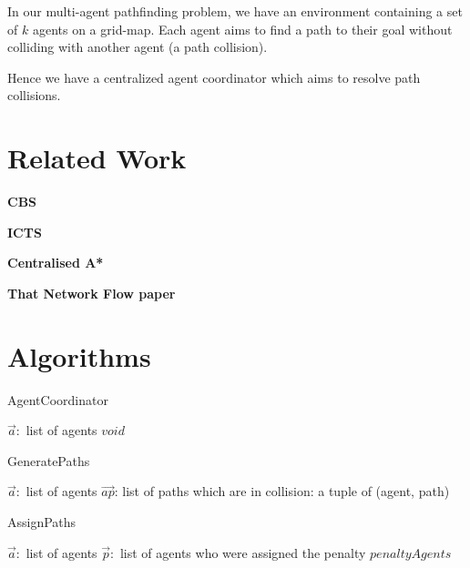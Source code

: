 \documentclass[a4paper,11pt]{article}
\let\oldReturn\Return
\renewcommand{\Return}{\State\oldReturn}
\begin{document}
In our multi-agent pathfinding problem, we have an environment containing a set of $k$ agents on a grid-map. Each agent aims to find a path to their goal without colliding with another agent (a path collision).

Hence we have a centralized agent coordinator which aims to resolve path collisions.

\section{Related Work}
\textbf{CBS}

\textbf{ICTS}

\textbf{Centralised A*}

\textbf{That Network Flow paper}

\section{Algorithms}

\begin{algorithm}
	\caption{AgentCoordinator}\label{alg_AgentCoordinator}
	\begin{algorithmic}[1]
		\Require $\vec{a}:$ list of agents
		\Ensure $void$
		\Do
	\end{algorithmic}
\end{algorithm}

\begin{algorithm}
	\caption{GeneratePaths}\label{alg_GeneratePaths}
	\begin{algorithmic}[1]
		\Require $\vec{a}:$ list of agents
		\Ensure $\vec{ap}$: list of paths which are in collision: a tuple of (agent, path)
		\EndFor
	\end{algorithmic}
\end{algorithm}

\begin{algorithm}
	\caption{AssignPaths}\label{alg_AssignPaths}
	\begin{algorithmic}[1]
		\Require $\vec{a}:$ list of agents
		\Ensure $\vec{p}:$ list of agents who were assigned the penalty
		\Return $penaltyAgents$
	\end{algorithmic}
\end{algorithm}
\end{document}
